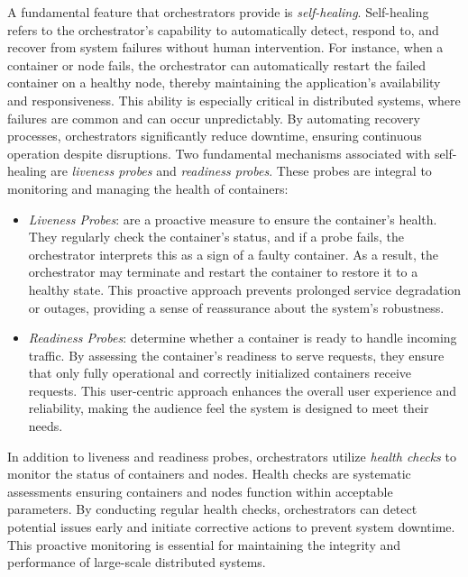 A fundamental feature that orchestrators provide is \textit{self-healing}.
Self-healing refers to the orchestrator's capability to automatically detect,
respond to, and recover from system failures without human intervention.
For instance, when a container or node fails, the orchestrator can automatically
restart the failed container on a healthy node, thereby maintaining the
application's availability and responsiveness.
This ability is especially critical in distributed systems, where failures are
common and can occur unpredictably.
By automating recovery processes, orchestrators significantly reduce downtime,
ensuring continuous operation despite disruptions.
Two fundamental mechanisms associated with self-healing are \textit{liveness
  probes} and \textit{readiness probes}. These probes are integral to monitoring
and managing the health of containers:

\begin{itemize}
  \itemsep0em
   \item \textit{Liveness Probes}: are a proactive measure to ensure the
     container's health.
     They regularly check the container's status, and if a probe fails, the
     orchestrator interprets this as a sign of a faulty container.
     As a result, the orchestrator may terminate and restart the container to
     restore it to a healthy state. This proactive approach prevents prolonged
     service degradation or outages, providing a sense of reassurance about the
     system's robustness.
    \item \textit{Readiness Probes}: determine whether a container is ready to
      handle incoming traffic.
      By assessing the container's readiness to serve requests, they ensure that
      only fully operational and correctly initialized containers receive requests.
      This user-centric approach enhances the overall user experience and
      reliability, making the audience feel the system is designed to meet their
      needs.
\end{itemize}

In addition to liveness and readiness probes, orchestrators utilize
\textit{health checks} to monitor the status of containers and nodes.
Health checks are systematic assessments ensuring containers and nodes function
within acceptable parameters.
By conducting regular health checks, orchestrators can detect potential issues
early and initiate corrective actions to prevent system downtime. This proactive
monitoring is essential for maintaining the integrity and performance of
large-scale distributed systems.

